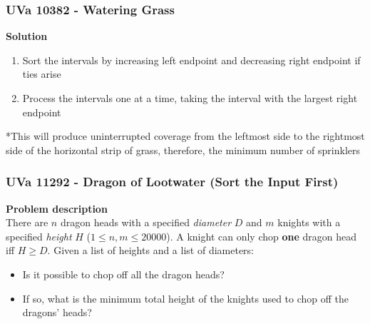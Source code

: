 \documentclass{beamer}
\begin{document}
\begin{frame}[fragile]
\frametitle{UVa 10382 - Watering Grass}

\color{red}\textbf{Solution}\color{black}
\begin{enumerate}
    \item Sort the intervals by increasing left endpoint and decreasing right endpoint if ties arise
    \item Process the intervals one at a time, taking the interval with the largest right endpoint
\end{enumerate} 

\vspace{0.3cm}

*This will produce uninterrupted coverage from the leftmost side to the rightmost side of the horizontal strip of grass, therefore, the minimum number of sprinklers

\end{frame}

\begin{frame}[fragile]
\frametitle{UVa 11292 - Dragon of Lootwater (Sort the Input First)}

\color{red}\textbf{Problem description}\color{black} \\
There are $n$ dragon heads with a specified \textit{diameter} $D$ and $m$ knights with a specified \textit{height} $H$ ($1\leq n,m \leq 20000$). A knight can only chop \textbf{one} dragon head iff $H \geq D$. Given a list of heights and a list of diameters:
\begin{itemize}
    \item Is it possible to chop off all the dragon heads?
    \item If so, what is the minimum total height of the knights used to chop off the dragons' heads?
\end{itemize}

\end{frame}
\end{document}
